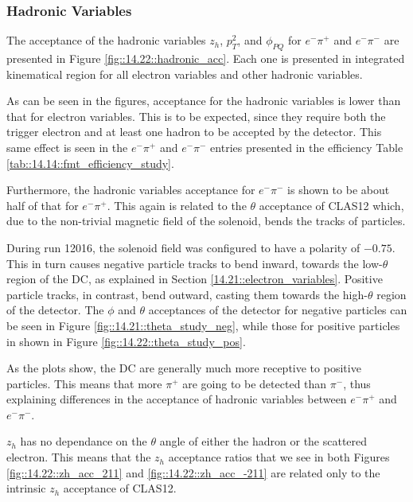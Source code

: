 \subsubsection{Hadronic Variables}
\label{14.22::hadronic_variables}
    The acceptance of the hadronic variables $z_h$, $p_T^2$, and $\phi_{PQ}$ for $e^-\pi^+$ and $e^-\pi^-$ are presented in Figure \ref{fig::14.22::hadronic_acc}.
    Each one is presented in integrated kinematical region for all electron variables and other hadronic variables.

    As can be seen in the figures, acceptance for the hadronic variables is lower than that for electron variables.
    This is to be expected, since they require both the trigger electron and at least one hadron to be accepted by the detector.
    This same effect is seen in the $e^-\pi^+$ and $e^-\pi^-$ entries presented in the efficiency Table \ref{tab::14.14::fmt_efficiency_study}.

    Furthermore, the hadronic variables acceptance for $e^-\pi^-$ is shown to be about half of that for $e^-\pi^+$.
    This again is related to the $\theta$ acceptance of CLAS12 which, due to the non-trivial magnetic field of the solenoid, bends the tracks of particles.

    During run 12016, the solenoid field was configured to have a polarity of $-0.75$.
    This in turn causes negative particle tracks to bend inward, towards the low-$\theta$ region of the DC, as explained in Section \ref{14.21::electron_variables}.
    Positive particle tracks, in contrast, bend outward, casting them towards the high-$\theta$ region of the detector.
    The $\phi$ and $\theta$ acceptances of the detector for negative particles can be seen in Figure \ref{fig::14.21::theta_study_neg}, while those for positive particles in shown in Figure \ref{fig::14.22::theta_study_pos}.

    As the plots show, the DC are generally much more receptive to positive particles.
    This means that more $\pi^+$ are going to be detected than $\pi^-$, thus explaining differences in the acceptance of hadronic variables between $e^-\pi^+$ and $e^-\pi^-$.

    $z_h$ has no dependance on the $\theta$ angle of either the hadron or the scattered electron.
    This means that the $z_h$ acceptance ratios that we see in both Figures \ref{fig::14.22::zh_acc_211} and \ref{fig::14.22::zh_acc_-211} are related only to the intrinsic $z_h$ acceptance of CLAS12.

